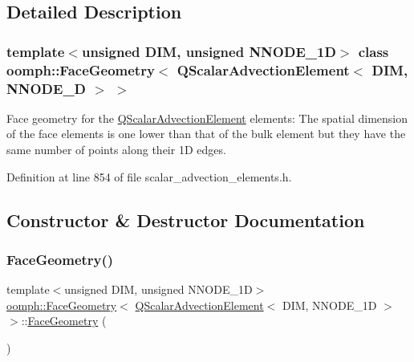 \subsection{Detailed Description}
\subsubsection*{template$<$unsigned D\+IM, unsigned N\+N\+O\+D\+E\+\_\+1D$>$\newline
class oomph\+::\+Face\+Geometry$<$ Q\+Scalar\+Advection\+Element$<$ D\+I\+M, N\+N\+O\+D\+E\+\_\+D $>$ $>$}

Face geometry for the \hyperlink{classoomph_1_1QScalarAdvectionElement}{Q\+Scalar\+Advection\+Element} elements\+: The spatial dimension of the face elements is one lower than that of the bulk element but they have the same number of points along their 1D edges. 

Definition at line 854 of file scalar\+\_\+advection\+\_\+elements.\+h.



\subsection{Constructor \& Destructor Documentation}
\mbox{\label{classoomph_1_1FaceGeometry_3_01QScalarAdvectionElement_3_01DIM_00_01NNODE__1D_01_4_01_4_aed9989bb8d8caab5b5571cf1a50d518e}} 
\subsubsection{\texorpdfstring{Face\+Geometry()}{FaceGeometry()}}
{\footnotesize\ttfamily template$<$unsigned D\+IM, unsigned N\+N\+O\+D\+E\+\_\+1D$>$ \\
\hyperlink{classoomph_1_1FaceGeometry}{oomph\+::\+Face\+Geometry}$<$ \hyperlink{classoomph_1_1QScalarAdvectionElement}{Q\+Scalar\+Advection\+Element}$<$ D\+IM, N\+N\+O\+D\+E\+\_\+1D $>$ $>$\+::\hyperlink{classoomph_1_1FaceGeometry}{Face\+Geometry} (\begin{DoxyParamCaption}{ }\end{DoxyParamCaption})\hspace{0.3cm}{\ttfamily [inline]}}




